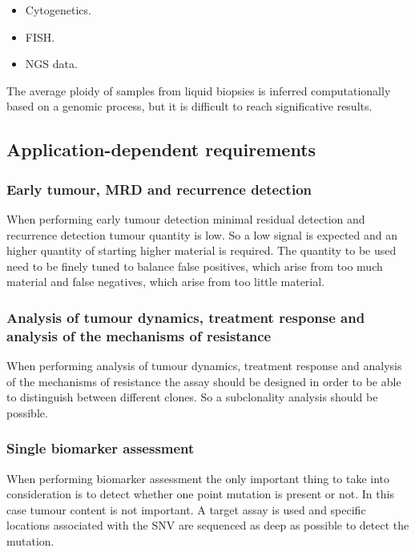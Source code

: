          \begin{multicols}{3}
             \begin{itemize}
                 \item Cytogenetics.
                 \item FISH.
                 \item NGS data.
             \end{itemize}
         \end{multicols}

         The average ploidy of samples from liquid biopsies is inferred computationally based on a genomic process, but it is difficult to reach significative results.

    \subsection{Application-dependent requirements}

        \subsubsection{Early tumour, MRD and recurrence detection}
        When performing early tumour detection minimal residual detection and recurrence detection tumour quantity is low.
        So a low signal is expected and an higher quantity of starting higher material is required.
        The quantity to be used need to be finely tuned to balance false positives, which arise from too much material and false negatives, which arise from too little material.

        \subsubsection{Analysis of tumour dynamics, treatment response and analysis of the mechanisms of resistance}
        When performing analysis of tumour dynamics, treatment response and analysis of the mechanisms of resistance the assay should be designed in order to be able to distinguish between different clones.
        So a subclonality analysis should be possible.

        \subsubsection{Single biomarker assessment}
        When performing biomarker assessment the only important thing to take into consideration is to detect whether one point mutation is present or not.
        In this case tumour content is not important.
        A target assay is used and specific locations associated with the SNV are sequenced as deep as possible to detect the mutation.

